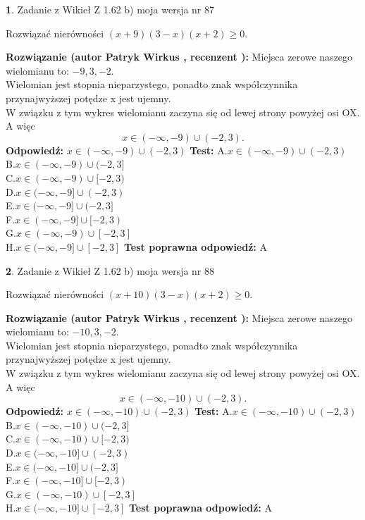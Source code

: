 \documentclass[12pt, a4paper]{article}
\theoremstyle{definition} %
\newtheorem{zad}{}
\newcommand{\zadStart}[1]{\begin{zad}#1\newline}
\newcommand{\zadStop}{\end{zad}}
\newcommand{\rozwStart}[2]{\noindent \textbf{Rozwiązanie (autor #1 , recenzent #2): }\newline}
\newcommand{\rozwStop}{\newline}
\newcommand{\odpStart}{\noindent \textbf{Odpowiedź:}\newline}
\newcommand{\odpStop}{\newline}
\newcommand{\testStart}{\noindent \textbf{Test:}\newline}
\newcommand{\testStop}{\newline}
\newcommand{\kluczStart}{\noindent \textbf{Test poprawna odpowiedź:}\newline}
\newcommand{\kluczStop}{\newline}
\begin{document}
\zadStart{Zadanie z Wikieł Z 1.62 b) moja wersja nr 87}

Rozwiązać nierówności $(x+9)(3-x)(x+2)\ge0$.
\zadStop
\rozwStart{Patryk Wirkus}{}
Miejsca zerowe naszego wielomianu to: $-9, 3, -2$.\\
Wielomian jest stopnia nieparzystego, ponadto znak współczynnika przy\linebreak najwyższej potędze x jest ujemny.\\ W związku z tym wykres wielomianu zaczyna się od lewej strony powyżej osi OX. A więc $$x \in (-\infty,-9) \cup (-2,3).$$
\rozwStop
\odpStart
$x \in (-\infty,-9) \cup (-2,3)$
\odpStop
\testStart
A.$x \in (-\infty,-9) \cup (-2,3)$\\
B.$x \in (-\infty,-9) \cup (-2,3]$\\
C.$x \in (-\infty,-9) \cup [-2,3)$\\
D.$x \in (-\infty,-9] \cup (-2,3)$\\
E.$x \in (-\infty,-9] \cup (-2,3]$\\
F.$x \in (-\infty,-9] \cup [-2,3)$\\
G.$x \in (-\infty,-9) \cup [-2,3]$\\
H.$x \in (-\infty,-9] \cup [-2,3]$
\testStop
\kluczStart
A
\kluczStop



\zadStart{Zadanie z Wikieł Z 1.62 b) moja wersja nr 88}

Rozwiązać nierówności $(x+10)(3-x)(x+2)\ge0$.
\zadStop
\rozwStart{Patryk Wirkus}{}
Miejsca zerowe naszego wielomianu to: $-10, 3, -2$.\\
Wielomian jest stopnia nieparzystego, ponadto znak współczynnika przy\linebreak najwyższej potędze x jest ujemny.\\ W związku z tym wykres wielomianu zaczyna się od lewej strony powyżej osi OX. A więc $$x \in (-\infty,-10) \cup (-2,3).$$
\rozwStop
\odpStart
$x \in (-\infty,-10) \cup (-2,3)$
\odpStop
\testStart
A.$x \in (-\infty,-10) \cup (-2,3)$\\
B.$x \in (-\infty,-10) \cup (-2,3]$\\
C.$x \in (-\infty,-10) \cup [-2,3)$\\
D.$x \in (-\infty,-10] \cup (-2,3)$\\
E.$x \in (-\infty,-10] \cup (-2,3]$\\
F.$x \in (-\infty,-10] \cup [-2,3)$\\
G.$x \in (-\infty,-10) \cup [-2,3]$\\
H.$x \in (-\infty,-10] \cup [-2,3]$
\testStop
\kluczStart
A
\kluczStop
\end{document}

